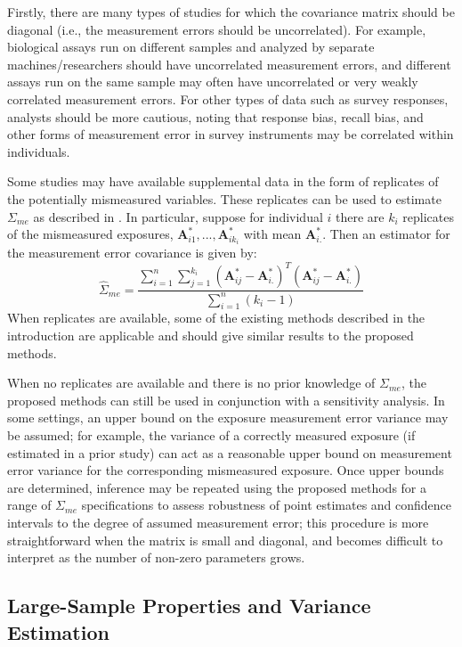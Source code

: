 \documentclass[useAMS,usenatbib,referee]{biom}
\begin{document}
Firstly, there are many types of studies for which the covariance matrix should be diagonal (i.e., the measurement errors should be uncorrelated). For example, biological assays run on different samples and analyzed by separate machines/researchers should have uncorrelated measurement errors, and different assays run on the same sample may often have uncorrelated or very weakly correlated measurement errors. For other types of data such as survey responses, analysts should be more cautious, noting that response bias, recall bias, and other forms of measurement error in survey instruments may be correlated within individuals.

Some studies may have available supplemental data in the form of replicates of the potentially mismeasured variables. These replicates can be used to estimate $\Sigma_{me}$ as described in \citet{carroll2006}. In particular, suppose for individual $i$ there are $k_{i}$ replicates of the mismeasured exposures, $\bm{A}^{*}_{i1}, ..., \bm{A}^{*}_{ik_{i}}$ with mean $\bm{A}^{*}_{i.}$. Then an estimator for the measurement error covariance is given by:
\begin{equation*}
    \hat{\Sigma}_{me} = \frac{\sum_{i=1}^{n} \sum_{j=1}^{k_{i}} (\bm{A}^{*}_{ij} - \bm{A}^{*}_{i.})^{T}(\bm{A}^{*}_{ij} - \bm{A}^{*}_{i.})}{\sum_{i=1}^{n}(k_{i} - 1)}
\end{equation*}
When replicates are available, some of the existing methods described in the introduction are applicable and should give similar results to the proposed methods.

When no replicates are available and there is no prior knowledge of $\Sigma_{me}$, the proposed methods can still be used in conjunction with a sensitivity analysis. In some settings, an upper bound on the exposure measurement error variance may be assumed; for example, the variance of a correctly measured exposure (if estimated in a prior study) can act as a reasonable upper bound on measurement error variance for the corresponding mismeasured exposure. Once upper bounds are determined, inference may be repeated using the proposed methods for a range of $\Sigma_{me}$ specifications to assess robustness of point estimates and confidence intervals to the degree of assumed measurement error; this procedure is more straightforward when the matrix is small and diagonal, and becomes difficult to interpret as the number of non-zero parameters grows.

\subsection{Large-Sample Properties and Variance Estimation}
\end{document}
